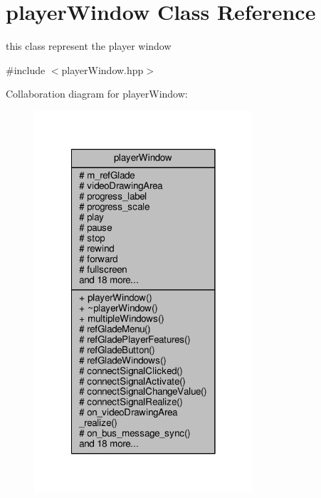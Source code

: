\hypertarget{classplayerWindow}{\section{player\-Window Class Reference}
\label{classplayerWindow}
}


this class represent the player window  




{\ttfamily \#include $<$player\-Window.\-hpp$>$}



Collaboration diagram for player\-Window\-:\nopagebreak
\begin{figure}[H]
\begin{center}
\leavevmode
\includegraphics[width=230pt]{classplayerWindow__coll__graph}
\end{center}
\end{figure}
